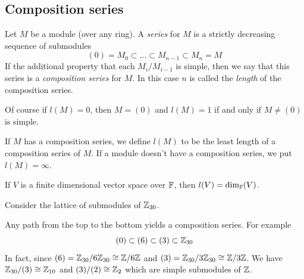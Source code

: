 \subsection{Composition series}
\begin{dang}
    \begin{definition}\cite{erdmann2018algebras}
        Let $M$ be a module (over any ring). A \textit{series} for $M$ is a strictly decreasing sequence of submodules 
        \begin{equation}
            (0)=M_0\subset\dots\subset M_{n-1}\subset M_n = M
        \end{equation}
        If the additional property that each $M_{i}/M_{i-1}$ is simple, then we say that this series is a \textit{composition series} for $M$.
        In this case $n$ is called the \textit{length} of the composition series.
    \end{definition}
\end{dang}
Of course if $l(M)=0$, then $M=(0)$ and $l(M)=1$ if and only if $M\neq(0)$ is simple.
\begin{dang}
    \begin{definition}\cite{erdmann2018algebras}
        If $M$ has a composition series, we define $l(M)$ to be the least length of a composition series of $M$. If a module doesn't have a composition series, we put $l(M)=\infty$.
    \end{definition}
\end{dang}
\begin{dang}
    \begin{example}
        If $V$ is a finite dimensional vector space over $\mathbb{F}$, then $l(V)=\text{dim}_{\mathbb{F}}(V)$.
    \end{example}
\end{dang}
\begin{dang}
    \begin{example}    
    Consider the lattice of submodules of $\mathbb{Z}_{30}$.
    \begin{center}
    \end{center}  
    Any path from the top to the bottom yields a composition series. For example
    \begin{equation}
        (0) \subset (6) \subset (3) \subset \mathbb{Z}_{30}
    \end{equation}
    In fact, since $(6) = \mathbb{Z}_{30}/6\mathbb{Z}_{30}\cong \mathbb{Z} /6\mathbb{Z}$ and $(3) = \mathbb{Z}_{30}/3\mathbb{Z}_{30}\cong \mathbb{Z}/3\mathbb{Z}$. We have $\mathbb{Z}_{30}/(3)\cong \mathbb{Z}_{10}$ and $(3)/(2)\cong\mathbb{Z}_{2}$ which are simple submodules of $\mathbb{Z}$.
    \end{example}
\end{dang}

